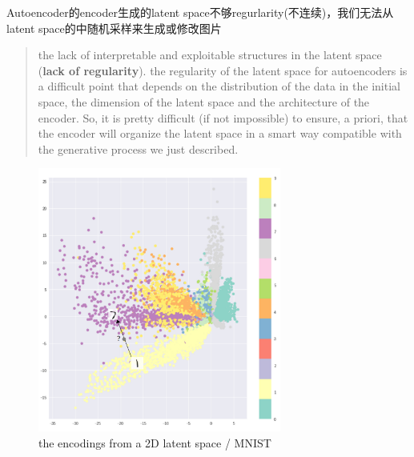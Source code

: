 Autoencoder的encoder生成的latent space不够regurlarity(不连续)，我们无法从latent space的中随机采样来生成或修改图片
\begin{quotation}
    the lack of interpretable and exploitable structures in the latent space (\textbf{lack of regularity}).
    the regularity of the latent space for autoencoders is a difficult point that depends on the distribution of the data in the initial space, the dimension of the latent space and the architecture of the encoder. So, it is pretty difficult (if not impossible) to ensure, a priori, that the encoder will organize the latent space in a smart way compatible with the generative process we just described.
\end{quotation}
\begin{figure}[H]
    \centering
    \includegraphics[width=8cm]{images/mnist_ae_latent_space.png}
    \caption{the encodings from a 2D latent space / MNIST}
    \label{fig:mnist_ae_latent_space}
\end{figure}

